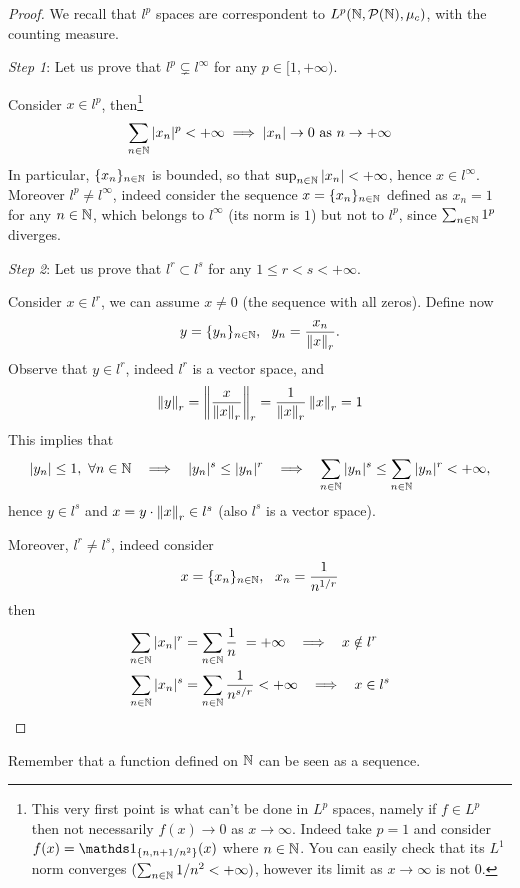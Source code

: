 \begin{proof}
	We recall that $l^p$ spaces are correspondent to $L^p(\mathbb N ,\mathcal P(\mathbb N) ,\mu_c)$, with the counting measure.

	\textit{Step 1}: Let us prove that $l^p \varsubsetneq l^{\infty}$ for any $p\in [ 1,+\infty )$.

	Consider $x\in l^p$, then\footnote{This very first point is what can't be done in $L^p$ spaces, namely if $f\in L^p$ then not necessarily $f(x)\to 0$ as $x\to \infty $. Indeed take $p=1$ and consider $f(x) =\Ind_{\{n,n+1/n^2\}}(x)$ where $n\in \mathbb N$. You can easily check that its $L^1$ norm converges $(\sum _{n\in \mathbb N} 1/n^2 < +\infty)$, however its limit as $x\to \infty $ is not $0$.}
	$$
		\sum\limits _{n\in \mathbb N}| x_n| ^{p} < +\infty \implies  | x_n| \to 0 \ \text{as} \ n\to  +\infty 
	$$
	In particular, $\{x_n\}_{n\in \mathbb N}$ is bounded, so that $\sup _{n\in \mathbb N}| x_n| < +\infty $, hence $x\in l^{\infty}$. Moreover $l^p \neq l^{\infty}$, indeed consider the sequence $x=\{x_n\}_{n\in \mathbb N}$ defined as $x_n =1$ for any $n\in \mathbb N$, which belongs to $l^{\infty}$ (its norm is $1$) but not to $l^p$, since $\sum _{n\in \mathbb N} 1^{p}$ diverges.

	\textit{Step 2}: Let us prove that $l^r \subset l^s$ for any $1\leq r< s< +\infty $.

	Consider $x\in l^r$, we can assume $x\neq 0$ (the sequence with all zeros). Define now
	$$
		y=\{y_{n}\}_{n\in \mathbb N} ,\ \ y_{n} =\frac{x_n}{\left\lVert x\right\rVert_r} .
	$$
	Observe that $y\in l^r$, indeed $l^r$ is a vector space, and
	$$
		\left\lVert y\right\rVert_r = \left\lVert\frac{x}{\left\lVert x\right\rVert_r}\right\rVert_r =\frac{1}{\left\lVert x\right\rVert_r}\left\lVert x\right\rVert_r =1
	$$
	This implies that
	$$
		|y_{n}| \leq 1,\ \forall n\in \mathbb N \ \ \implies  \ \ | y_{n}| ^{s} \leq | y_{n}| ^{r} \ \ \implies  \ \ \sum\limits _{n\in \mathbb N}| y_{n}| ^{s} \leq \sum\limits _{n\in \mathbb N}| y_{n}| ^{r} < +\infty ,
	$$
	hence $y\in l^s$ and $x=y\cdot \left\lVert x\right\rVert_r \in l^s$ (also $l^s$ is a vector space).

	Moreover, $l^r \neq l^s$, indeed consider
	$$
		x=\{x_n\}_{n\in \NN} ,\ \ x_n =\frac{1}{n^{1/r}}
	$$
	then
	\begin{align*}
		\sum\limits _{n\in \mathbb N}| x_n| ^{r} &=\sum\limits _{n\in \mathbb N}\frac{1}{n} \ =+\infty \ \ \implies  \ \ x\notin l^r\\
		\sum\limits _{n\in \mathbb N}| x_n| ^{s} &=\sum\limits _{n\in \mathbb N}\frac{1}{n^{s/r}} < +\infty \ \ \implies  \ \ x\in l^s
	\end{align*}
\end{proof}


Remember that a function defined on $\mathbb N$ can be seen as a sequence.

